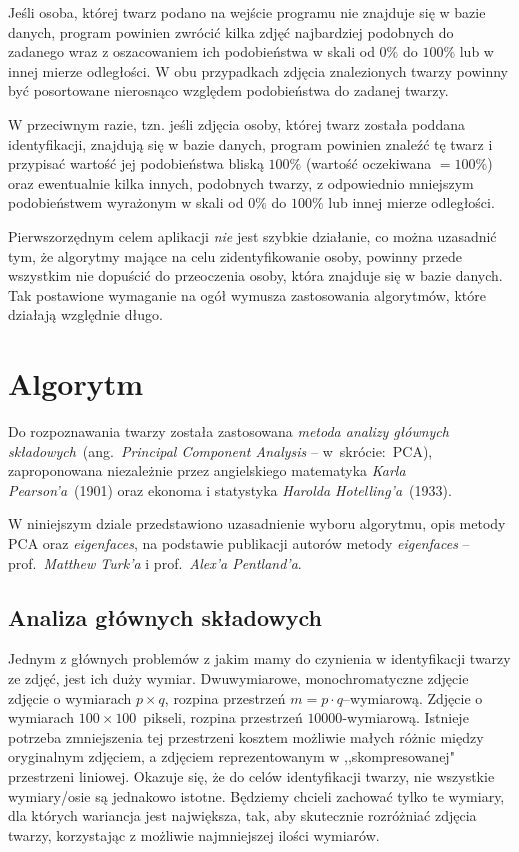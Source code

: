 \documentclass[a4paper,titlepage]{article}
\theoremstyle{break}
\numberwithin{equation}{subsection}
\begin{document}
Jeśli osoba, której twarz podano na wejście programu nie znajduje się w bazie danych, program powinien zwrócić kilka zdjęć najbardziej podobnych do zadanego wraz z oszacowaniem ich podobieństwa w skali od $0\%$ do $100\%$ lub w innej mierze odległości. W obu przypadkach zdjęcia znalezionych twarzy powinny być posortowane nierosnąco względem podobieństwa do zadanej twarzy.

W przeciwnym razie, tzn. jeśli zdjęcia osoby, której twarz została poddana identyfikacji, znajdują się w bazie danych, program powinien znaleźć tę twarz i przypisać wartość jej podobieństwa bliską $100\%$ (wartość oczekiwana $=100\%$) oraz ewentualnie kilka innych, podobnych twarzy, z odpowiednio mniejszym podobieństwem wyrażonym w skali od $0\%$ do $100\%$ lub innej mierze odległości.

Pierwszorzędnym celem aplikacji \emph{nie} jest szybkie działanie, co można uzasadnić tym, że algorytmy mające na celu zidentyfikowanie osoby, powinny przede wszystkim nie dopuścić do przeoczenia osoby, która znajduje się w bazie danych. Tak postawione wymaganie na ogół wymusza zastosowania algorytmów, które działają względnie długo.


\section{Algorytm}
\label{sec:algorytm}

Do rozpoznawania twarzy została zastosowana \emph{metoda analizy głównych składowych}~(ang.~\emph{Principal Component Analysis} -- w~skrócie:~PCA), zaproponowana niezależnie przez angielskiego matematyka \emph{Karla Pearson'a}~(1901) oraz ekonoma i statystyka \emph{Harolda Hotelling'a}~(1933).

W niniejszym dziale przedstawiono uzasadnienie wyboru algorytmu, opis metody PCA oraz \emph{eigenfaces}, na podstawie publikacji autorów metody \emph{eigenfaces} -- prof.~\emph{Matthew Turk'a} i prof.~\emph{Alex'a Pentland'a}\cite{turk}.


\subsection{Analiza głównych składowych}

Jednym z głównych problemów z jakim mamy do czynienia w identyfikacji twarzy ze zdjęć, jest ich duży wymiar. Dwuwymiarowe, monochromatyczne zdjęcie zdjęcie o wymiarach $p\times q$, rozpina przestrzeń $m=p\cdot q$--wymiarową. Zdjęcie o wymiarach $100\times 100$~pikseli, rozpina przestrzeń $10000$-wymiarową. Istnieje potrzeba zmniejszenia tej przestrzeni kosztem możliwie małych różnic między oryginalnym zdjęciem, a zdjęciem reprezentowanym w ,,skompresowanej" przestrzeni liniowej. Okazuje się, że do celów identyfikacji twarzy, nie wszystkie wymiary/osie są jednakowo istotne. Będziemy chcieli zachować tylko te wymiary, dla których wariancja jest największa, tak, aby skutecznie rozróżniać zdjęcia twarzy, korzystając z możliwie najmniejszej ilości wymiarów\cite{www:opencv}.
\end{document}
